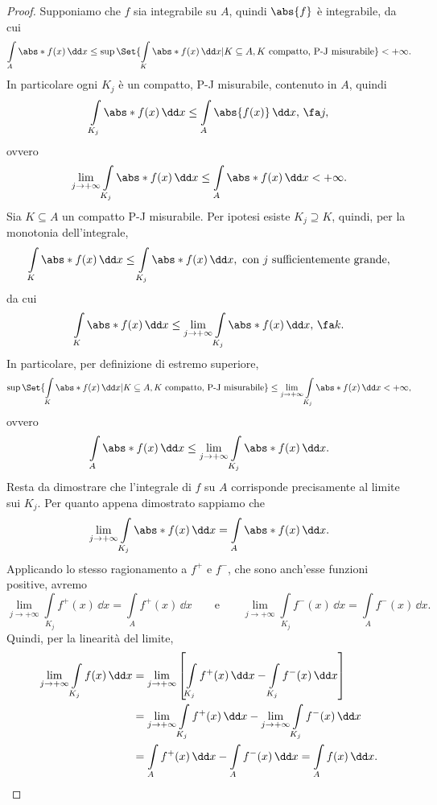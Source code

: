 \begin{proof}
	\graffito{\(\Leftarrow)\)}Supponiamo che \(f\) sia integrabile su \(A\), quindi \(\abs{f}\) è integrabile, da cui
	\[
		\int\limits_A \abs*{f(x)}\,\dd x \le \sup\Set{\int\limits_K \abs*{f(x)}\,\dd x | K\subseteq A, K\text{ compatto, P-J misurabile}}<+\infty.
	\]
	In particolare ogni \(K_j\) è un compatto, P-J misurabile, contenuto in \(A\), quindi
	\[
		\int\limits_{K_j}\abs*{f(x)}\,\dd x \le \int\limits_A \abs{f(x)}\,\dd x,\,\fa j,
	\]
	ovvero
	\[
		\lim_{j\to +\infty}\int\limits_{K_j}\abs*{f(x)}\,\dd x \le \int\limits_A \abs*{f(x)}\,\dd x < +\infty.
	\]
	\graffito{\(\Rightarrow)\)}Sia \(K\subseteq A\) un compatto P-J misurabile.
	Per ipotesi esiste \(K_j \supseteq K\), quindi, per la monotonia dell'integrale,
	\[
		\int\limits_K \abs*{f(x)}\,\dd x \le \int\limits_{K_j}\abs*{f(x)}\,\dd x,\text{ con \(j\) sufficientemente grande},
	\]
	da cui
	\[
		\int\limits_K \abs*{f(x)}\,\dd x \le \lim_{j\to +\infty} \int\limits_{K_j}\abs*{f(x)}\,\dd x,\,\fa k.
	\]
	In particolare, per definizione di estremo superiore,
	\[
		\sup\Set{\int\limits_K \abs*{f(x)}\,\dd x | K\subseteq A, K\text{ compatto, P-J misurabile}} \le \lim_{j\to +\infty}\int\limits_{K_j} \abs*{f(x)}\,\dd x < +\infty,
	\]
	ovvero
	\[
		\int\limits_A \abs*{f(x)}\,\dd x \le \lim_{j\to +\infty} \int\limits_{K_j} \abs*{f(x)}\,\dd x.
	\]
	Resta da dimostrare che l'integrale di \(f\) su \(A\) corrisponde precisamente al limite sui \(K_j\).
	Per quanto appena dimostrato sappiamo che
	\[
		\lim_{j\to +\infty}\int\limits_{K_j}\abs*{f(x)}\,\dd x = \int\limits_A \abs*{f(x)}\,\dd x.
	\]
	Applicando lo stesso ragionamento a \(f^+\) e \(f^-\), che sono anch'esse funzioni positive, avremo
	\[
		\lim_{j\to +\infty}\int\limits_{K_j}f^+(x)\,\dd x = \int\limits_A f^+(x)\,\dd x \qquad\text{e}\qquad \lim_{j\to +\infty}\int\limits_{K_j}f^-(x)\,\dd x = \int\limits_A f^-(x)\,\dd x.
	\]
	Quindi, per la linearità del limite,
	\[
		\begin{split}
			\lim_{j\to +\infty}\int\limits_{K_j}f(x)\,\dd x & = \lim_{j\to +\infty} \left[ \int\limits_{K_j}f^+(x)\,\dd x - \int\limits_{K_j}f^-(x)\,\dd x \right]\\
			& = \lim_{j\to +\infty} \int\limits_{K_j}f^+(x)\,\dd x - \lim_{j\to +\infty} \int\limits_{K_j}f^-(x)\,\dd x\\
			& = \int\limits_A f^+(x)\,\dd x - \int\limits_A f^-(x)\,\dd x = \int\limits_A f(x)\,\dd x.\qedhere
		\end{split}
	\]
\end{proof}

